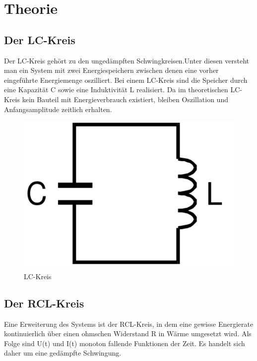 \section{Theorie}
\label{sec:Theorie}


\subsection{Der LC-Kreis}
Der LC-Kreis gehört zu den ungedämpften Schwingkreisen.Unter diesen versteht man
 ein System mit zwei Energiespeichern zwischen denen eine vorher eingeführte Energiemenge
  oszilliert. Bei einem LC-Kreis sind die Speicher durch eine Kapazität C sowie
  eine Induktivität L realisiert. Da im theoretischen LC-Kreis kein Bauteil mit Energieverbrauch
   existiert, bleiben Oszillation und Anfangsamplitude zeitlich erhalten.

   \begin{figure}[H]
     \centering
     \includegraphics[width=\linewidth-300pt,height=\textheight-300pt,keepaspectratio]{content/CL.png}
     \caption{LC-Kreis}
     \label{fig:CL_Kreis}
   \end{figure}

   \subsection{Der RCL-Kreis}
Eine Erweiterung des Systems ist der RCL-Kreis, in dem eine gewisse Energierate
kontinuierlich über einen ohmschen Widerstand R in Wärme umgesetzt wird. Als Folge sind
U(t) und I(t)  monoton fallende Funktionen der Zeit. Es handelt sich daher um eine gedämpfte
 Schwingung.

